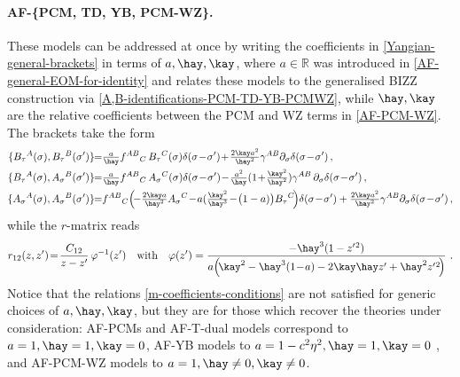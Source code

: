 \documentclass[12pt]{article}
\numberwithin{equation}{section}
\begin{document}




\paragraph{AF-\{PCM, TD, YB, PCM-WZ\}.}
These models can be addressed at once by writing the coefficients in \eqref{Yangian-general-brackets} in terms of $a,\hay,\kay$, where $a\in \mathbb{R}$ was introduced in \eqref{AF-general-EOM-for-identity} and relates these models to the generalised BIZZ construction via \eqref{A,B-identifications-PCM-TD-YB-PCMWZ}, while $\hay,\kay$ are the relative coefficients between the PCM and WZ terms in \eqref{AF-PCM-WZ}. The brackets take the form 
\begin{align}\label{PCM-TD-YB-Poisson-brackets}
\{ B_{\tau}{}^{A}(\sigma),B_{\tau}{}^{B}(\sigma') \} \!\!=& \tfrac{a}{\hay}f^{AB}{}_{C} \, B_{\tau}{}^{C}(\sigma)\delta(\sigma\!-\!\sigma')\!+\!\tfrac{2\kay a^2}{\hay^2}\gamma^{AB}\partial_{\sigma}\delta(\sigma\!-\!\sigma') \, ,
\notag \\
\{ B_{\tau}{}^{A}(\sigma),A_{\sigma}{}^{B}(\sigma') \} \!\!=& \tfrac{a}{\hay}f^{AB}{}_{C} \, A_{\sigma}{}^{C}(\sigma)\delta(\sigma\!-\!\sigma')\!-\!\tfrac{a^2}{\hay}(1\!+\!\tfrac{\kay^2}{\hay^2})\gamma^{AB} \, \partial_{\sigma}\delta(\sigma\!-\!\sigma') \, ,
\\
\{ A_{\sigma}{}^{A}(\sigma),A_{\sigma}{}^{B}(\sigma') \} \!\!=& f^{AB}{}_{C}\Bigl(\!-\tfrac{2\kay a}{\hay^2}A_{\sigma}{}^{C}\!-\! a(\tfrac{\kay^2}{\hay^3}\!-\!\bigl(1-a)\bigr)B_{\tau}{}^{C}\!\Bigr)\delta(\sigma\!-\!\sigma')+\tfrac{2\kay a^2}{\hay^2}\gamma^{AB}\partial_{\sigma}\delta(\sigma\!-\!\sigma') \, ,
\notag
\end{align}
while the $r$-matrix reads
\begin{equation}
r_{12}(z,z')\!=\!\frac{C_{12}}{z-z'} \, \varphi^{-1}(z') 
\quad \text{with} \quad 
\varphi(z')=\frac{-\hay^3(1-z'{}^2)}{a\Bigl(\!\kay^2-\hay^3(1\!-\!a)-2\kay\hay z'+\hay^2 z'{}^{2}\! \Bigr)} \,\, .
\end{equation}
Notice that the relations \eqref{m-coefficients-conditions} are not satisfied for generic choices of $a,\hay,\kay$, but they are for those which recover the theories under consideration: AF-PCMs and AF-T-dual models correspond to $a=1,\hay=1,\kay=0$, AF-YB models to $a=1-c^2\eta^2,\hay=1,\kay=0$ \cite{Delduc:2013fga,Lacroix:2018njs}, and AF-PCM-WZ models to $a=1,\hay \neq0, \kay \neq 0$.
\end{document}
